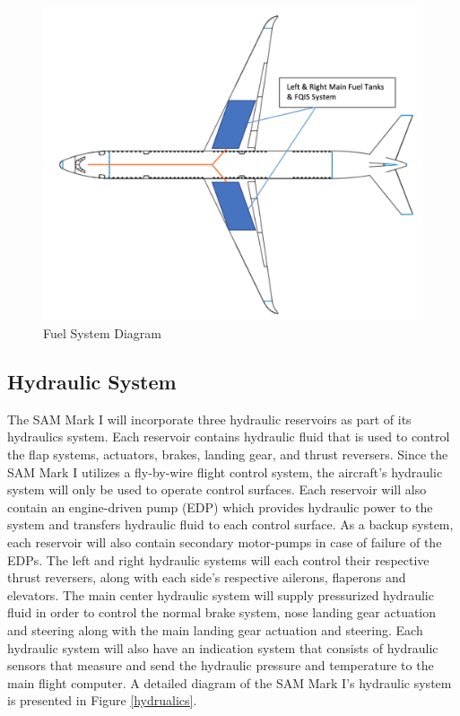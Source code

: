 \begin{figure}[H]
    \centering
    \includegraphics[width=.85\linewidth]{Photos/Fuel_tanks.png}
    \caption{Fuel System Diagram}
    \label{fuel_tank}
\end{figure}
 
\subsection{Hydraulic System}
The SAM Mark I will incorporate three hydraulic reservoirs as part of its hydraulics system. Each reservoir contains hydraulic fluid that is used to control the flap systems, actuators, brakes, landing gear, and thrust reversers. Since the SAM Mark I utilizes a fly-by-wire flight control system, the aircraft’s hydraulic system will only be used to operate control surfaces. Each reservoir will also contain an engine-driven pump (EDP) which provides hydraulic power to the system and transfers hydraulic fluid to each control surface. As a backup system, each reservoir will also contain secondary motor-pumps in case of failure of the EDPs. The left and right hydraulic systems will each control their respective thrust reversers, along with each side’s respective ailerons, flaperons and elevators. The main center hydraulic system will supply pressurized hydraulic fluid in order to control the normal brake system, nose landing gear actuation and steering along with the main landing gear actuation and steering. Each hydraulic system will also have an indication system that consists of hydraulic sensors that measure and send the hydraulic pressure and temperature to the main flight computer. A detailed diagram of the SAM Mark I’s hydraulic system is presented in Figure \ref{hydrualics}. 


